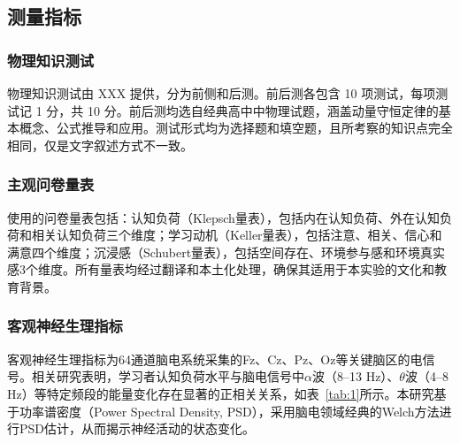 \documentclass[runningheads]{llncs}
\begin{document}
\subsection{测量指标}
\subsubsection{物理知识测试}
物理知识测试由 XXX 
提供，分为前侧和后测。前后测各包含 10 项测试，每项测试记 1 分，共 10 分。前后测均选自经典高中中物理试题，涵盖动量守恒定律的基本概念、公式推导和应用。测试形式均为选择题和填空题，且所考察的知识点完全相同，仅是文字叙述方式不一致。

\subsubsection{主观问卷量表}
使用的问卷量表包括：认知负荷（Klepsch量表）\cite{klepsch2017development}，包括内在认知负荷、外在认知负荷和相关认知负荷三个维度；学习动机（Keller量表）\cite{keller1983motivational}，包括注意、相关、信心和满意四个维度；沉浸感（Schubert量表）\cite{schubert2001experience}，包括空间存在、环境参与感和环境真实感3个维度。所有量表均经过翻译和本土化处理，确保其适用于本实验的文化和教育背景。

\subsubsection{客观神经生理指标}
客观神经生理指标为64通道脑电系统采集的Fz、Cz、Pz、Oz等关键脑区的电信号。相关研究表明，学习者认知负荷水平与脑电信号中$\alpha$波（8–13 Hz）、$\theta$波（4–8 Hz）等特定频段的能量变化存在显著的正相关关系，如表~\ref{tab:1}所示。本研究基于功率谱密度（Power Spectral Density, PSD），采用脑电领域经典的Welch方法进行PSD估计，从而揭示神经活动的状态变化。

\end{document}
